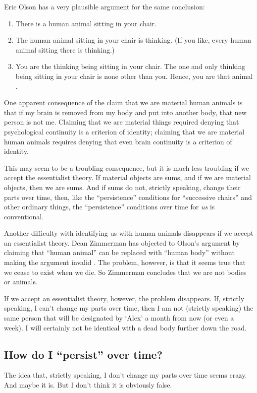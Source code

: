 \documentclass[11pt]{article}
\begin{document}
\begin{spacing}{1.5}
Eric Olson has a very plausible argument for the same conclusion:

\begin{enumerate}
  \item There is a human animal sitting in your chair.
  \item The human animal sitting in your chair is thinking. (If you
    like, every human animal sitting there is thinking.)
  \item You are the thinking being sitting in your chair. The one and
    only thinking being sitting in your chair is none other than
    you. Hence, you are that animal \citeyearpar[354]{olson2003a}.
\end{enumerate}

One apparent consequence of the claim that we are material human
animals is that if my brain is removed from my body and put into
another body, that new person is not me.  Claiming that we are
material things required denying that psychological continuity is a
criterion of identity; claiming that we are material human animals
requires denying that even brain continuity is a criterion of
identity.

This may seem to be a troubling consequence, but it is much less
troubling if we accept the essentialist theory.  If material objects
are sums, and if we are material objects, then we are sums.  And if
sums do not, strictly speaking, change their parts over time, then,
like the ``persistence'' conditions for ``successive chairs'' and
other ordinary things, the ``persistence'' conditions over time for
{\em us} is conventional.

Another difficulty with identifying us with human animals disappears
if we accept an essentialist theory.  Dean Zimmerman has objected to
Olson's argument by claiming that ``human animal'' can be replaced
with ``human body'' without making the argument invalid
\citeyearpar[24]{zimmerman2008a}.  The problem, however, is that it
seems true that we cease to exist when we die.  So Zimmerman concludes
that we are not bodies or animals.

If we accept an essentialist theory, however, the problem disappears.
If, strictly speaking, I can't change my parts over time, then I am
not (strictly speaking) the same person that will be designated by
`Alex' a month from now (or even a week).  I will certainly not be
identical with a dead body further down the road.

\subsection{How do I ``persist'' over time?}
\label{person-persist}
The idea that, strictly speaking, I don't change my parts over time
seems crazy.  And maybe it is.  But I don't think it is obviously
false.


\end{spacing}
\end{document}

